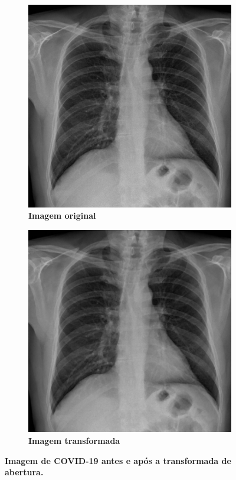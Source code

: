 \documentclass[
12pt,        %
oneside,     %
a4paper,     %
english,       %
brazil        %
%
%
]{ppgca}
\begin{document}
\begin{figure}[H]
\centering
    \begin{subfigure}[b]{0.45\textwidth}
        \includegraphics[width=\textwidth]{covid1.jpeg}
        \centering
        \caption{\textbf{Imagem original}}
        \label{fig:covid1antes}
    \end{subfigure}
    \hfill
    \begin{subfigure}[b]{0.45\textwidth}
        \includegraphics[width=\textwidth]{covid1opening.jpeg}
        \centering
        \caption{\textbf{{Imagem transformada}}}
        \label{fig:covid1opening}
    \end{subfigure}
    \caption{\textbf{{Imagem de COVID-19 antes e após a transformada de abertura.}}}
    \label{fig:covidopening}
\end{figure}
\end{document}
